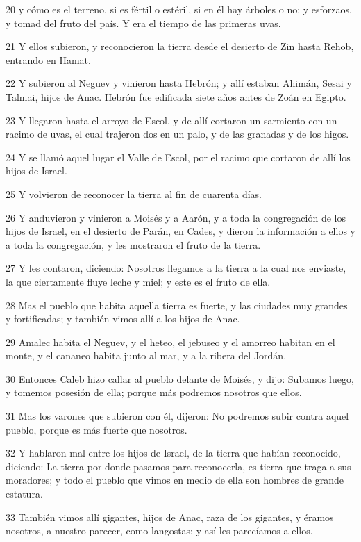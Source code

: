 \par 20 y cómo es el terreno, si es fértil o estéril, si en él hay árboles o no; y esforzaos, y tomad del fruto del país. Y era el tiempo de las primeras uvas.
\par 21 Y ellos subieron, y reconocieron la tierra desde el desierto de Zin hasta Rehob, entrando en Hamat.
\par 22 Y subieron al Neguev y vinieron hasta Hebrón; y allí estaban Ahimán, Sesai y Talmai, hijos de Anac. Hebrón fue edificada siete años antes de Zoán en Egipto.
\par 23 Y llegaron hasta el arroyo de Escol, y de allí cortaron un sarmiento con un racimo de uvas, el cual trajeron dos en un palo, y de las granadas y de los higos.
\par 24 Y se llamó aquel lugar el Valle de Escol, por el racimo que cortaron de allí los hijos de Israel.
\par 25 Y volvieron de reconocer la tierra al fin de cuarenta días.
\par 26 Y anduvieron y vinieron a Moisés y a Aarón, y a toda la congregación de los hijos de Israel, en el desierto de Parán, en Cades, y dieron la información a ellos y a toda la congregación, y les mostraron el fruto de la tierra.
\par 27 Y les contaron, diciendo: Nosotros llegamos a la tierra a la cual nos enviaste, la que ciertamente fluye leche y miel; y este es el fruto de ella.
\par 28 Mas el pueblo que habita aquella tierra es fuerte, y las ciudades muy grandes y fortificadas; y también vimos allí a los hijos de Anac.
\par 29 Amalec habita el Neguev, y el heteo, el jebuseo y el amorreo habitan en el monte, y el cananeo habita junto al mar, y a la ribera del Jordán.
\par 30 Entonces Caleb hizo callar al pueblo delante de Moisés, y dijo: Subamos luego, y tomemos posesión de ella; porque más podremos nosotros que ellos.
\par 31 Mas los varones que subieron con él, dijeron: No podremos subir contra aquel pueblo, porque es más fuerte que nosotros.
\par 32 Y hablaron mal entre los hijos de Israel, de la tierra que habían reconocido, diciendo: La tierra por donde pasamos para reconocerla, es tierra que traga a sus moradores; y todo el pueblo que vimos en medio de ella son hombres de grande estatura.
\par 33 También vimos allí gigantes, hijos de Anac, raza de los gigantes, y éramos nosotros, a nuestro parecer, como langostas; y así les parecíamos a ellos.

